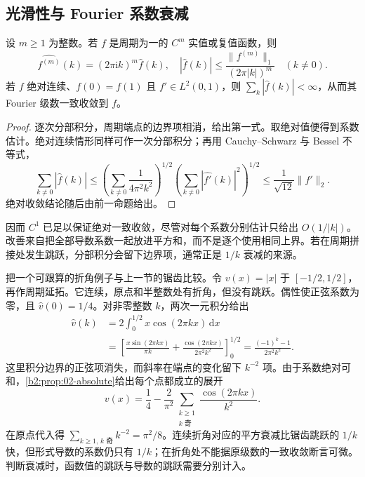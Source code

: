 \subsection{光滑性与 Fourier 系数衰减}
\label{b2:subsec:020504}

\begin{proposition}\label{b2:prop:02-smooth-decay}
设 \(m\geq1\) 为整数。若 \(f\) 是周期为一的 \(C^m\) 实值或复值函数，则
\[
 \widehat {f^{(m)}}(k)=(2\pi\mathrm{i}k)^m\widehat f(k),
 \quad |\widehat f(k)|\leq\dfrac{\|f^{(m)}\|_1}{(2\pi|k|)^m}\quad(k\ne0).
\]
若 \(f\) 绝对连续、\(f(0)=f(1)\) 且 \(f'\in L^2(0,1)\)，则 \(\sum_k|\widehat f(k)|<\infty\)，从而其 Fourier 级数一致收敛到 \(f\)。
\end{proposition}
\begin{proof}
逐次分部积分，周期端点的边界项相消，给出第一式。取绝对值便得到系数估计。绝对连续情形同样可作一次分部积分；再用 Cauchy--Schwarz 与 Bessel 不等式，
\[
 \sum_{k\ne0}|\widehat f(k)|
 \leq\left(\sum_{k\ne0}\dfrac1{4\pi^2k^2}\right)^{1/2}
       \left(\sum_{k\ne0}|\widehat {f'}(k)|^2\right)^{1/2}
 \leq\dfrac1{\sqrt{12}}\|f'\|_2.
\]
绝对收敛结论随后由前一命题给出。
\end{proof}

因而 \(C^1\) 已足以保证绝对一致收敛，尽管对每个系数分别估计只给出 \(O(1/|k|)\)。改善来自把全部导数系数一起放进平方和，而不是逐个使用相同上界。若在周期拼接处发生跳跃，分部积分会留下边界项，通常正是 \(1/k\) 衰减的来源。

\ProseParagraphBreak

把一个可跟算的折角例子与上一节的锯齿比较。令 \(v(x)=|x|\) 于 \([-1/2,1/2]\)，再作周期延拓。它连续，原点和半整数处有折角，但没有跳跃。偶性使正弦系数为零，且 \(\widehat v(0)=1/4\)。对非零整数 \(k\)，两次一元积分给出
\[
 \begin{aligned}
 \widehat v(k)&=2\int_0^{1/2}x\cos(2\pi kx)\,\mathrm dx\\
 &=\left[\frac{x\sin(2\pi kx)}{\pi k}
          +\frac{\cos(2\pi kx)}{2\pi^2k^2}\right]_0^{1/2}
 =\frac{(-1)^k-1}{2\pi^2k^2}.
 \end{aligned}
\]
这里积分边界的正弦项消失，而斜率在端点的变化留下 \(k^{-2}\) 项。由于系数绝对可和，\cref{b2:prop:02-absolute}给出每个点都成立的展开
\[
 v(x)=\frac14-\frac2{\pi^2}
       \sum_{\substack{k\geq1\\k\text{ 奇}}}\frac{\cos(2\pi kx)}{k^2}.
\]
在原点代入得 \(\sum_{k\geq1,\,k\text{ 奇}}k^{-2}=\pi^2/8\)。连续折角对应的平方衰减比锯齿跳跃的 \(1/k\) 快，但形式导数的系数仍只有 \(1/k\)；在折角处不能据原级数的一致收敛断言可微。判断衰减时，函数值的跳跃与导数的跳跃需要分别计入。

